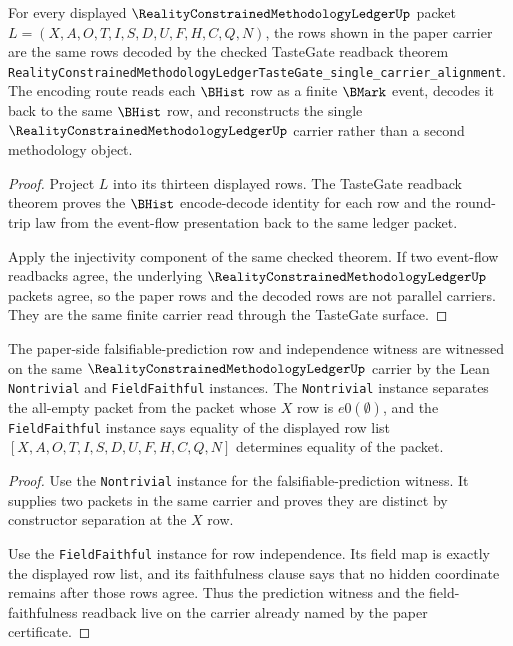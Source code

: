 \begin{theorem}
\label{thm:reality-constrained-methodology-ledger-tastegate-readback-surface}
For every displayed $\RealityConstrainedMethodologyLedgerUp$ packet
$L=(X,A,O,T,I,S,D,U,F,H,C,Q,N)$, the rows shown in the paper carrier are the
same rows decoded by the checked TasteGate readback theorem
\texttt{RealityConstrainedMethodologyLedgerTasteGate\_single\_carrier\_alignment}.
The encoding route reads each $\BHist$ row as a finite $\BMark$ event, decodes
it back to the same $\BHist$ row, and reconstructs the single
$\RealityConstrainedMethodologyLedgerUp$ carrier rather than a second
methodology object.
\end{theorem}
\begin{proof}
Project $L$ into its thirteen displayed rows. The TasteGate readback theorem
proves the $\BHist$ encode-decode identity for each row and the round-trip law
from the event-flow presentation back to the same ledger packet.

Apply the injectivity component of the same checked theorem. If two event-flow
readbacks agree, the underlying $\RealityConstrainedMethodologyLedgerUp$
packets agree, so the paper rows and the decoded rows are not parallel
carriers. They are the same finite carrier read through the TasteGate surface.
\end{proof}

\begin{theorem}
\label{thm:reality-constrained-methodology-ledger-nontrivial-field-faithful-readback}
The paper-side falsifiable-prediction row and independence witness are
witnessed on the same $\RealityConstrainedMethodologyLedgerUp$ carrier by the
Lean \texttt{Nontrivial} and \texttt{FieldFaithful} instances. The
\texttt{Nontrivial} instance separates the all-empty packet from the packet
whose $X$ row is $e0(\emptyset)$, and the \texttt{FieldFaithful} instance
says equality of the displayed row list
$[X,A,O,T,I,S,D,U,F,H,C,Q,N]$ determines equality of the packet.
\end{theorem}
\begin{proof}
Use the \texttt{Nontrivial} instance for the falsifiable-prediction witness.
It supplies two packets in the same carrier and proves they are distinct by
constructor separation at the $X$ row.

Use the \texttt{FieldFaithful} instance for row independence. Its field map is
exactly the displayed row list, and its faithfulness clause says that no hidden
coordinate remains after those rows agree. Thus the prediction witness and the
field-faithfulness readback live on the carrier already named by the paper
certificate.
\end{proof}

